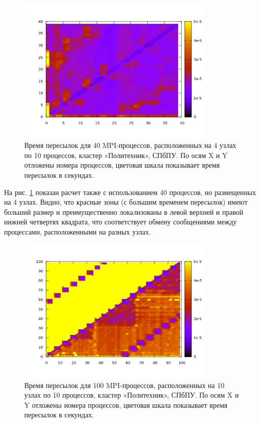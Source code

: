          \begin{figure}[htb]
         	\begin{center}
         		\includegraphics[height=7cm,keepaspectratio]{images/RomanenkoAASnytnikovAVChernykhIGadaptationtosupercomputerfinalEXTENDEDREFERENCES-img12.png}
         	\end{center}
         	\caption{Время пересылок для 40 MPI-процессов, расположенных на 4 узлах по 10 процессов, кластер «Политехник», СПбПУ. По осям X и Y отложены номера процессов, цветовая шкала показывает время пересылок в секундах.}
         	\label{Poly4_10}
         \end{figure}
        
        
        На рис. \ref{Poly4_10} показан расчет также с использованием 40 процессов, но размещенных на 4 узлах. Видно, что красные зоны (с большим временем пересылок) имеют больший размер и преимущественно локализованы в левой верхней и правой нижней четвертях квадрата, что соответствует обмену сообщениями между процессами, расположенными на разных узлах.
        
         \begin{figure}[htb]
         	\begin{center}
         		\includegraphics[height=7cm,keepaspectratio]{images/RomanenkoAASnytnikovAVChernykhIGadaptationtosupercomputerfinalEXTENDEDREFERENCES-img13.png}
         	\end{center}
         	\caption{Время пересылок для 100 MPI-процессов, расположенных на 10 узлах по 10 процессов, кластер «Политехник», СПбПУ. По осям X и Y отложены номера процессов, цветовая шкала показывает время пересылок в секундах.}
         	\label{Poly10_10}
         \end{figure}
        
